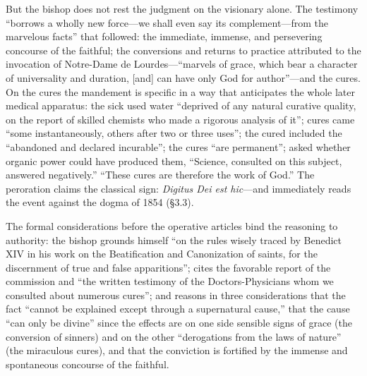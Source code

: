But the bishop does not rest the judgment on the visionary alone.
The testimony ``borrows a wholly new force---we shall even say its
complement---from the marvelous facts'' that followed: the
immediate, immense, and persevering concourse of the faithful; the
conversions and returns to practice attributed to the invocation
of Notre-Dame de Lourdes---``marvels of grace, which bear a
character of universality and duration, [and] can have only God
for author''---and the cures. On the cures the mandement is
specific in a way that anticipates the whole later medical
apparatus: the sick used water ``deprived of any natural curative
quality, on the report of skilled chemists who made a rigorous
analysis of it''; cures came ``some instantaneously, others after
two or three uses''; the cured included the ``abandoned and
declared incurable''; the cures ``are permanent''; asked whether
organic power could have produced them, ``Science, consulted on
this subject, answered negatively.'' ``These cures are therefore
the work of God.''
The peroration claims the classical sign: \emph{Digitus Dei est
hic}---and immediately reads the event against the dogma of 1854
(\S3.3).

The formal considerations before the operative articles bind the
reasoning to authority: the bishop grounds himself ``on the rules
wisely traced by Benedict XIV in his work on the Beatification and
Canonization of saints, for the discernment of true and false
apparitions''; cites the favorable report of the commission and
``the written testimony of the Doctors-Physicians whom we
consulted about numerous cures''; and reasons in three
considerations that the fact ``cannot be explained except through
a supernatural cause,'' that the cause ``can only be divine''
since the effects are on one side sensible signs of grace (the
conversion of sinners) and on the other ``derogations from the
laws of nature'' (the miraculous cures), and that the conviction
is fortified by the immense and spontaneous concourse of the
faithful.

